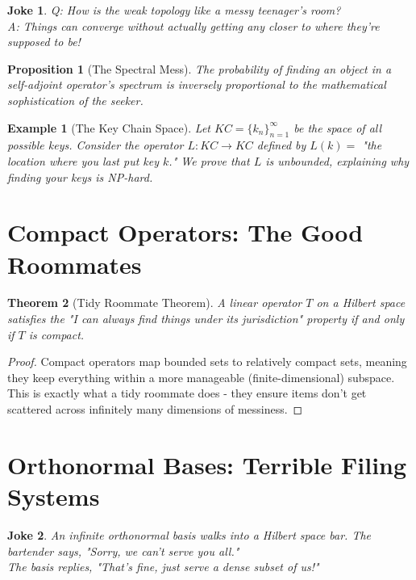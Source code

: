 \documentclass{article}
\newtheorem{theorem}{Theorem}
\newtheorem{proposition}[theorem]{Proposition}
\newtheorem{example}{Example}
\newtheorem{joke}{Joke}
\begin{document}
\begin{joke}
    Q: How is the weak topology like a messy teenager's room?\\
    A: Things can converge without actually getting any closer to where they're supposed to be!
\end{joke}

\begin{proposition}[The Spectral Mess]
    The probability of finding an object in a self-adjoint operator's spectrum is inversely proportional to the mathematical sophistication of the seeker.
\end{proposition}

\begin{example}[The Key Chain Space]
    Let $KC = \{k_n\}_{n=1}^{\infty}$ be the space of all possible keys. Consider the operator $L: KC \to KC$ defined by $L(k) = $ "the location where you last put key $k$." We prove that $L$ is unbounded, explaining why finding your keys is NP-hard.
\end{example}

\section{Compact Operators: The Good Roommates}

\begin{theorem}[Tidy Roommate Theorem]
    A linear operator $T$ on a Hilbert space satisfies the "I can always find things under its jurisdiction" property if and only if $T$ is compact.
\end{theorem}

\begin{proof}
    Compact operators map bounded sets to relatively compact sets, meaning they keep everything within a more manageable (finite-dimensional) subspace. This is exactly what a tidy roommate does - they ensure items don't get scattered across infinitely many dimensions of messiness.
\end{proof}

\section{Orthonormal Bases: Terrible Filing Systems}

\begin{joke}
    An infinite orthonormal basis walks into a Hilbert space bar. The bartender says, "Sorry, we can't serve you all."\\
    The basis replies, "That's fine, just serve a dense subset of us!"
\end{joke}
\end{document}
